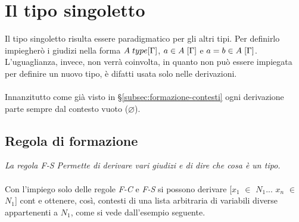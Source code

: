 \documentclass[10pt,a4paper, italian]{book}
\begin{document}
{{{\section{Il tipo singoletto}
\label{sec:tipo-singoletto}
Il tipo singoletto risulta essere paradigmatico per gli altri tipi. Per definirlo impiegher\`o i giudizi nella forma $A\hspace{0.1cm}type[\Gamma]$, $a \in A\hspace{0.1cm}[\Gamma]$ e $a = b \in A\hspace{0.1cm}[\Gamma]$. L'uguaglianza, invece, non verr\`a coinvolta, in quanto non pu\`o essere impiegata per definire un nuovo tipo, \`e difatti usata solo nelle derivazioni.\\\\
Innanzitutto come gi\`a visto in \S\ref{subsec:formazione-contesti} ogni derivazione parte sempre dal contesto vuoto ($\varnothing$).
\begin{prooftree}
\end{prooftree}

\subsection{Regola di formazione}
\label{subsec:formazione}
\begin{prooftree}
\end{prooftree}
\textit{La regola F-S Permette di derivare vari giudizi e di dire che cosa \`e un tipo.}\\\\
Con l'impiego solo delle regole \textit{F-C} e \textit{F-S} si possono derivare [$x_1$ $\in$ $N_1$... $x_n$ $\in$ $N_1$] cont e ottenere, cos\`i, contesti di una lista arbitraria di variabili diverse appartenenti a $N_1$, come si vede dall'esempio seguente.
\begin{prooftree}
\end{prooftree}

}}}
\end{document}
